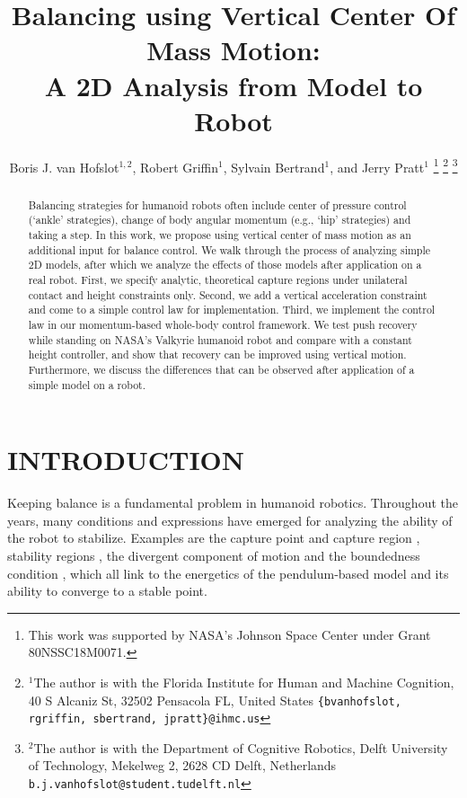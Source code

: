 \documentclass[letterpaper, 10 pt, conference]{ieeeconf}  %
\title{\LARGE \bf
Balancing using Vertical Center Of Mass Motion: \\ A 2D Analysis from Model to Robot
}
\author{Boris J. van Hofslot$^{1,2}$, Robert Griffin$^1$, Sylvain Bertrand$^1$, and Jerry Pratt$^1$%
\thanks{This work was supported by NASA's Johnson Space Center under Grant 80NSSC18M0071.}%
\thanks{$^{1}$The author is with the Florida Institute for Human and Machine Cognition, 40 S Alcaniz St, 32502 Pensacola FL, United States
        {\tt\small \{bvanhofslot, rgriffin, sbertrand, jpratt\}@ihmc.us}}%
\thanks{$^{2}$The author is with the Department of Cognitive Robotics, Delft University of Technology, Mekelweg 2, 2628 CD Delft, Netherlands
        {\tt\small b.j.vanhofslot@student.tudelft.nl}}%
}
\begin{document}
\maketitle
\thispagestyle{empty}
\pagestyle{empty}



\begin{abstract}
Balancing strategies for humanoid robots often include center of pressure control (`ankle' strategies), change of body angular momentum (e.g., `hip' strategies) and taking a step. In this work, we propose using vertical center of mass motion as an additional input for balance control. We walk through the process of analyzing simple 2D models, after which we analyze the effects of those models after application on a real robot. First, we specify analytic, theoretical capture regions under unilateral contact and height constraints only. Second, we add a vertical acceleration constraint and come to a simple control law for implementation. Third, we implement the control law in our momentum-based whole-body control framework. We test push recovery while standing on NASA's Valkyrie humanoid robot and compare with a constant height controller, and show that recovery can be improved using vertical motion. Furthermore, we discuss the differences that can be observed after application of a simple model on a robot.
\end{abstract}



\section{INTRODUCTION}
Keeping balance is a fundamental problem in humanoid robotics. Throughout the years, many conditions and expressions have emerged for analyzing the ability of the robot to stabilize. Examples are the capture point and capture region \cite{pratt2006capture, koolen2012capturability}, stability regions \cite{stephens2007humanoid}, the divergent component of motion \cite{takenaka2009real} and the boundedness condition \cite{lanari2014boundedness}, which all link to the energetics of the pendulum-based model and its ability to converge to a stable point.
\end{document}
